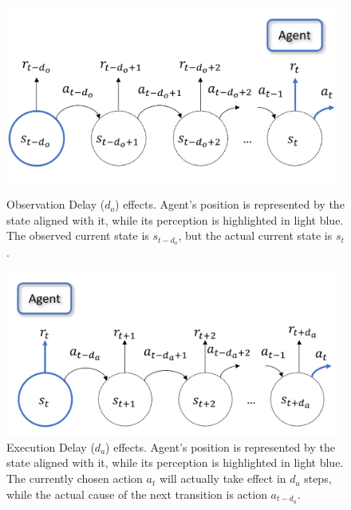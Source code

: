             \begin{figure}
                \centering
                
                \includegraphics[width=11cm, keepaspectratio]{images/dmdp/o_delay.png}
                \caption{Observation Delay ($d_o$) effects. Agent's position is represented by the state aligned with it, while its perception is highlighted in light blue. The observed current state is $s_{t-d_{o}}$, but the actual current state is $s_{t}$.}
                \label{fig:o_delay}
                
                \vspace{0.5cm}
                
                \includegraphics[width=11cm, keepaspectratio]{images/dmdp/a_delay.png}
                \caption{Execution Delay ($d_a$) effects. Agent's position is represented by the state aligned with it, while its perception is highlighted in light blue. The currently chosen action $a_t$ will actually take effect in $d_a$ steps, while the actual cause of the next transition is action $a_{t-d_{a}}$.}
                \label{fig:a_delay}
                
                \vspace{0.5cm}
                

\end{figure}
